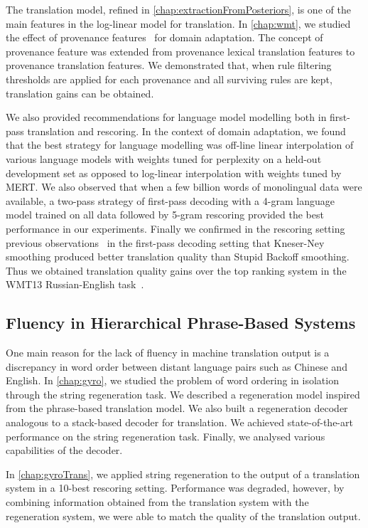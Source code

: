 The translation model, refined in \autoref{chap:extractionFromPosteriors},
is one of the main features in the log-linear model for translation.
In \autoref{chap:wmt}, we studied the effect of provenance
features~\citep{chiang-deneefe-pust:2011:ACL} for domain adaptation.
The concept of provenance feature was extended from provenance lexical translation
features to provenance translation features. We demonstrated that,
when rule filtering thresholds are applied for each provenance and all
surviving rules are kept, translation gains can be obtained.

We also provided recommendations for language model modelling both
in first-pass translation and rescoring. In the context of
domain adaptation, we found that the best strategy for language modelling
was off-line linear interpolation of various language models with
weights tuned for perplexity on a held-out development set as opposed
to log-linear interpolation with weights tuned by MERT.
We also observed that when a few billion words of monolingual data were
available, a two-pass strategy of first-pass decoding with a 4-gram
language model trained on all data followed by 5-gram rescoring
provided the best performance in our experiments.
Finally we confirmed in the rescoring setting previous
observations~\citep{brants-popat-xu-och-dean:2007:EMNLP-CoNLL} in
the first-pass decoding setting
that Kneser-Ney smoothing produced better translation quality than
Stupid Backoff smoothing. Thus we obtained translation quality gains
over the top ranking system in the WMT13 Russian-English
task~\citep{pino-waite-xiao-degispert-flego-byrne:2013:WMT}.

\subsection{Fluency in Hierarchical Phrase-Based Systems}

One main reason for the lack of fluency in machine translation
output is a discrepancy in word order between distant language pairs
such as Chinese and English. In \autoref{chap:gyro}, we
studied the problem of word ordering in isolation through
the string regeneration task. We described a regeneration
model inspired from the phrase-based translation model. We also
built a regeneration decoder
analogous to a stack-based decoder for translation.
We achieved state-of-the-art performance on the string regeneration
task. Finally, we analysed various capabilities of the decoder.

In \autoref{chap:gyroTrans}, we applied string regeneration
to the output of a translation system in a 10-best rescoring setting.
Performance was degraded, however, by combining information obtained
from the translation system with the regeneration system, we were
able to match the quality of the translation output.

